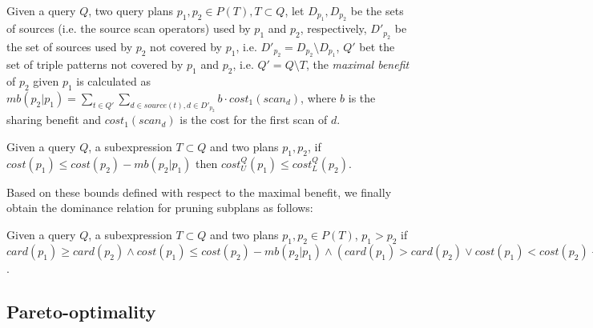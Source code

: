   
\begin{definition}
  Given a query $Q$, two query plans $p_1,p_2 \in P(T), T \subset Q$, let $D_{p_1},D_{p_2}$ be the sets of sources (i.e. the source scan operators) used by $p_1$ and $p_2$, respectively, $D'_{p_2}$ be the set of sources used by $p_2$ not covered by $p_1$, i.e. $D'_{p_2} = D_{p_2} \setminus D_{p_1}$, $Q'$ bet the set of triple patterns not covered by $p_1$ and $p_2$, i.e. $Q' = Q \setminus T$, the \emph{maximal benefit} of $p_2$ given $p_1$ is calculated as $mb(p_2|p_1) = \sum_{t \in Q'}
  \sum_{d \in source(t), d \in D'_{p_2} } b \cdot cost_1(scan_d)$, where $b$ is the sharing benefit and
  $cost_1(scan_d)$ is the cost for the first scan
  of $d$.
\end{definition}

\begin{lemma}
  \label{def:estimated_bound}
  Given a query $Q$, a subexpression $T \subset Q$ and two plans $p_1,p_2$, if $cost(p_1) \leq cost(p_2) - mb(p_2|p_1)$ then $cost_U^Q(p_1) \leq cost_L^Q(p_2)$.
\end{lemma}

%
  
Based on these bounds defined with respect to the maximal benefit, we finally obtain the dominance relation for
pruning subplans as follows:

\begin{theorem}
  Given a query $Q$, a subexpression $T \subset Q$ and two plans
  $p_1,p_2 \in P(T)$, $p_1 > p_2$ if
  $card(p_1) \geq card(p_2) \wedge cost(p_1) \leq cost(p_2) -
  mb(p_2|p_1) \wedge (card(p_1) > card(p_2) \vee cost(p_1) <
  cost(p_2) - mb(p_2|p_1))$.
\end{theorem}


\subsection{Pareto-optimality}
\label{sec:pareto}

